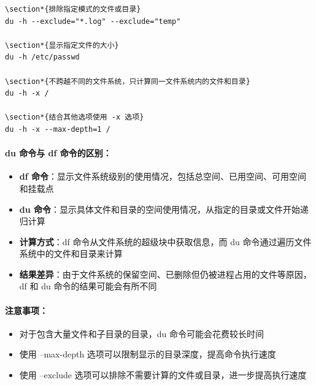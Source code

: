 \documentclass[12pt,UTF8]{ctexbook}
\begin{document}
\begin{verbatim}
\section*{排除指定模式的文件或目录}
du -h --exclude="*.log" --exclude="temp"

\section*{显示指定文件的大小}
du -h /etc/passwd

\section*{不跨越不同的文件系统，只计算同一文件系统内的文件和目录}
du -h -x /

\section*{结合其他选项使用 -x 选项}
du -h -x --max-depth=1 /
\end{verbatim}

\paragraph{du 命令与 df 命令的区别：}
\begin{itemize}
    \item \textbf{df 命令}：显示文件系统级别的使用情况，包括总空间、已用空间、可用空间和挂载点
    \item \textbf{du 命令}：显示具体文件和目录的空间使用情况，从指定的目录或文件开始递归计算
    \item \textbf{计算方式}：df 命令从文件系统的超级块中获取信息，而 du 命令通过遍历文件系统中的文件和目录来计算
    \item \textbf{结果差异}：由于文件系统的保留空间、已删除但仍被进程占用的文件等原因，df 和 du 命令的结果可能会有所不同
\end{itemize}

\paragraph{注意事项：}
\begin{itemize}
    \item 对于包含大量文件和子目录的目录，du 命令可能会花费较长时间
    \item 使用 --max-depth 选项可以限制显示的目录深度，提高命令执行速度
    \item 使用 --exclude 选项可以排除不需要计算的文件或目录，进一步提高执行速度
\end{itemize}
\end{document}
